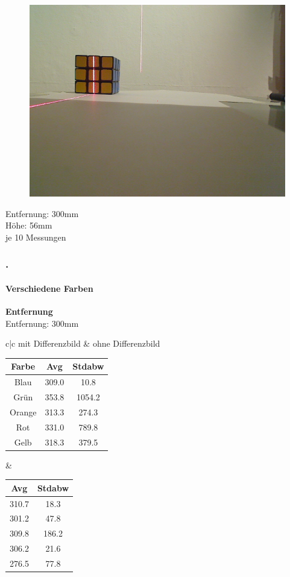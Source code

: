\documentclass[xcolor=dvipsnames]{beamer}
\def\frametitlesec{\frametitle{\arabic{section}.\hspace{0.5ex}\insertsection}}
\def\framesubtitles#1{\framesubtitle{\hspace{3.5ex}#1}}
\begin{document}
\begin{frame}
\begin{figure}
\begin{minipage}{0.32\linewidth}
			\includegraphics[width=\linewidth]{includes/test_color_3}
		\end{minipage}
	\end{figure}
	
	Entfernung: 300mm\\
	Höhe: 56mm\\
	je 10 Messungen
	
\end{frame}

\begin{frame}
	\frametitlesec
	\framesubtitles{Verschiedene Farben}
		\textbf{Entfernung}\\

		Entfernung: 300mm
		
		\begin{tabular}{c|c}		
		mit Differenzbild & ohne Differenzbild\\
		\begin{tabular}{c|c|c}
Farbe  & Avg & Stdabw\\ \hline
Blau   & 309.0 & 10.8\\
Grün   & 353.8 & 1054.2\\
Orange & 313.3 & 274.3\\
Rot    & 331.0 & 789.8\\
Gelb   & 318.3 & 379.5\\
		\end{tabular}
		
		& 
		
		\begin{tabular}{c|c}
Avg & Stdabw\\ \hline
310.7 & 18.3\\
301.2 & 47.8\\
309.8 & 186.2\\
306.2 & 21.6\\
276.5 & 77.8\\
		\end{tabular}
		
		\end{tabular}
\end{frame}
\end{document}
